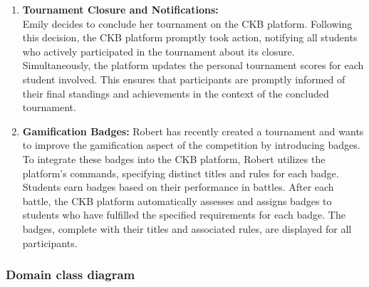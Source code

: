 \begin{enumerate}
    \item \textbf{Tournament Closure and Notifications:} \\
    Emily decides to conclude her tournament on the CKB platform. Following this decision, the CKB platform promptly took action, notifying all students who actively participated in the tournament about its closure. Simultaneously, the platform updates the personal tournament scores for each student involved. This ensures that participants are promptly informed of their final standings and achievements in the context of the concluded tournament.
    

    \item \textbf{Gamification Badges:}
    Robert has recently created a tournament and wants to improve the gamification aspect of the competition by introducing badges. To integrate these badges into the  CKB platform, Robert utilizes the platform's commands, specifying distinct titles and rules for each badge. Students earn badges based on their performance in battles. After each battle, the CKB platform automatically assesses and assigns badges to students who have fulfilled the specified requirements for each badge.
The badges, complete with their titles and associated rules, are displayed for all participants.
    
    
\end{enumerate}

\subsubsection{Domain class diagram}

